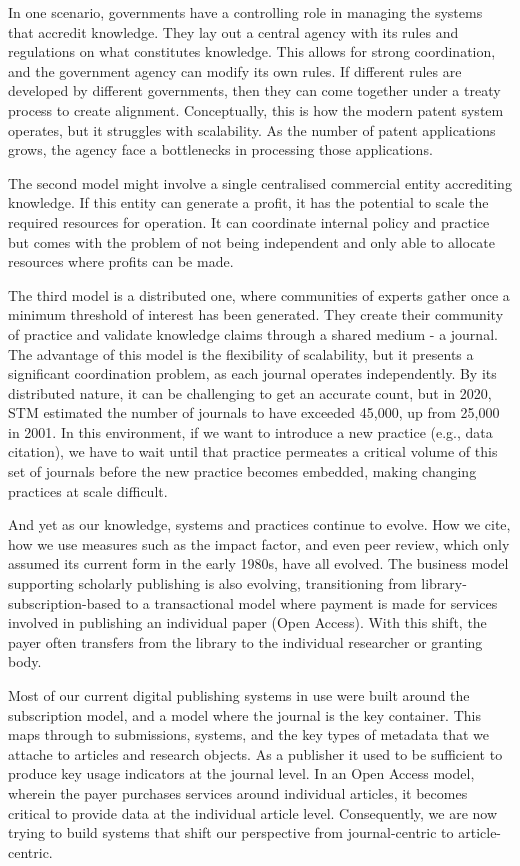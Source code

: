 \documentclass[]{hdsr}
\begin{document}
In one scenario, governments have a controlling role in managing the systems that accredit knowledge. They lay out a central agency with its rules and regulations on what constitutes knowledge. This allows for strong coordination, and the government agency can modify its own rules. If different rules are developed by different governments, then they can come together under a treaty process to create alignment. Conceptually, this is how the modern patent system operates, but it struggles with scalability. As the number of patent applications grows, the agency face a bottlenecks in processing those applications.

The second model might involve a single centralised commercial entity accrediting knowledge. If this entity can generate a profit, it has the potential to scale the required resources for operation. It can coordinate internal policy and practice but comes with the problem of not being independent and only able to allocate resources where profits can be made.

The third model is a distributed one, where communities of experts gather once a minimum threshold of interest has been generated. They create their community of practice and validate knowledge claims through a shared medium - a journal. The advantage of this model is the flexibility of scalability, but it presents a significant coordination problem, as each journal operates independently. By its distributed nature, it can be challenging to get an accurate count, but in 2020, STM estimated the number of journals to have exceeded 45,000, up from 25,000 in 2001. In this environment, if we want to introduce a new practice (e.g., data citation), we have to wait until that practice permeates a critical volume of this set of journals before the new practice becomes embedded, making changing practices at scale difficult.

And yet as our knowledge, systems and practices continue to evolve. How we cite, how we use measures such as the impact factor, and even peer review, which only assumed its current form in the early 1980s, have all evolved.
The business model supporting scholarly publishing is also evolving, transitioning from library-subscription-based to a transactional model where payment is made for services involved in publishing an individual paper (Open Access). With this shift, the payer often transfers from the library to the individual researcher or granting body.

Most of our current digital publishing systems in use were built around the subscription model, and a model where the journal is the key container. This maps through to submissions, systems, and the key types of metadata that we attache to articles and research objects. As a publisher it used to be sufficient to produce key usage indicators at the journal level. In an Open Access model, wherein the payer purchases services around individual articles, it becomes critical to provide data at the individual article level. Consequently, we are now trying to build systems that shift our perspective from journal-centric to article-centric.
\end{document}
